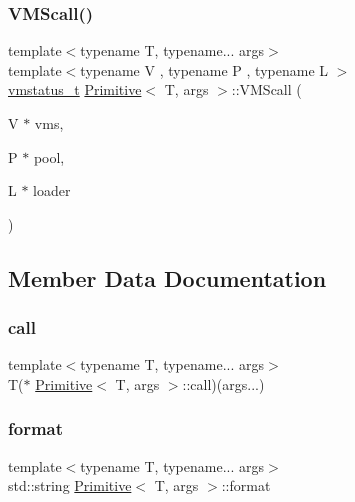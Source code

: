 \subsubsection{\texorpdfstring{V\+M\+Scall()}{VMScall()}}
{\footnotesize\ttfamily template$<$typename T, typename... args$>$ \\
template$<$typename V , typename P , typename L $>$ \\
\hyperlink{_instruction_8h_a6202215407ab29590bb936ca2996cf64}{vmstatus\+\_\+t} \hyperlink{struct_primitive}{Primitive}$<$ T, args $>$\+::V\+M\+Scall (\begin{DoxyParamCaption}\item[{V $\ast$}]{vms,  }\item[{P $\ast$}]{pool,  }\item[{L $\ast$}]{loader }\end{DoxyParamCaption})\hspace{0.3cm}{\ttfamily [inline]}}



\subsection{Member Data Documentation}
\mbox{\label{struct_primitive_a31a16d23d239e574ba4e47f6b8e41a9d}} 
\subsubsection{\texorpdfstring{call}{call}}
{\footnotesize\ttfamily template$<$typename T, typename... args$>$ \\
T($\ast$ \hyperlink{struct_primitive}{Primitive}$<$ T, args $>$\+::call)(args...)}

\mbox{\label{struct_primitive_afa8c2d4087b36ae9580fed3dc00e47b6}} 
\subsubsection{\texorpdfstring{format}{format}}
{\footnotesize\ttfamily template$<$typename T, typename... args$>$ \\
std\+::string \hyperlink{struct_primitive}{Primitive}$<$ T, args $>$\+::format}

\mbox{\label{struct_primitive_a45ef953a37468a97b5a4b5531e5f21ce}} 
